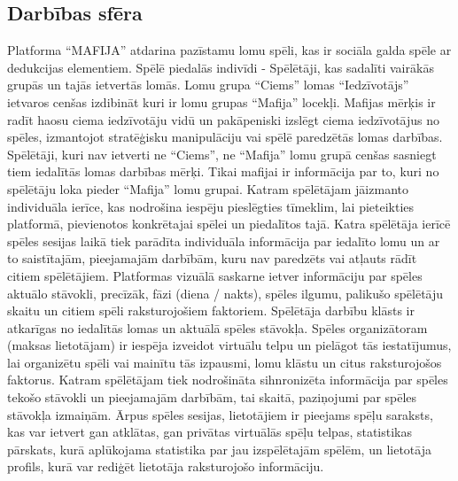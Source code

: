 \subsection*{Darbības sfēra}
Platforma ``MAFIJA'' atdarina pazīstamu lomu spēli, kas ir sociāla galda spēle ar dedukcijas elementiem.
Spēlē piedalās indivīdi - Spēlētāji, kas sadalīti vairākās grupās un tajās ietvertās lomās.
Lomu grupa ``Ciems'' lomas ``Iedzīvotājs'' ietvaros cenšas izdibināt kuri ir lomu grupas ``Mafija'' locekļi.
Mafijas mērķis ir radīt haosu ciema iedzīvotāju vidū un pakāpeniski izslēgt ciema iedzīvotājus no spēles, izmantojot stratēģisku manipulāciju vai spēlē paredzētās lomas darbības.
Spēlētāji, kuri nav ietverti ne ``Ciems'', ne ``Mafija'' lomu grupā cenšas sasniegt tiem iedalītās lomas darbības mērķi.
Tikai mafijai ir informācija par to, kuri no spēlētāju loka pieder ``Mafija'' lomu grupai.
Katram spēlētājam jāizmanto individuāla ierīce, kas nodrošina iespēju pieslēgties tīmeklim, lai pieteikties platformā, pievienotos konkrētajai spēlei un piedalītos tajā.
Katra spēlētāja ierīcē spēles sesijas laikā tiek parādīta individuāla informācija par iedalīto lomu un ar to saistītajām, pieejamajām darbībām, kuru nav paredzēts vai atļauts rādīt citiem spēlētājiem.
Platformas vizuālā saskarne ietver informāciju par spēles aktuālo stāvokli, precīzāk, fāzi (diena / nakts), spēles ilgumu, palikušo spēlētāju skaitu un citiem spēli raksturojošiem faktoriem.
Spēlētāja darbību klāsts ir atkarīgas no iedalītās lomas un aktuālā spēles stāvokļa.
Spēles organizātoram (maksas lietotājam) ir iespēja izveidot virtuālu telpu un pielāgot tās iestatījumus, lai organizētu spēli vai mainītu tās izpausmi, lomu klāstu un citus raksturojošos faktorus.
Katram spēlētājam tiek nodrošināta sihnronizēta informācija par spēles tekošo  stāvokli un pieejamajām darbībām, tai skaitā, paziņojumi par spēles stāvokļa izmaiņām.
Ārpus spēles sesijas, lietotājiem ir pieejams spēļu saraksts, kas var ietvert gan atklātas, gan privātas virtuālās spēļu telpas, statistikas pārskats, kurā aplūkojama statistika par jau izspēlētajām spēlēm, un lietotāja profils, kurā var rediģēt lietotāja raksturojošo informāciju.
